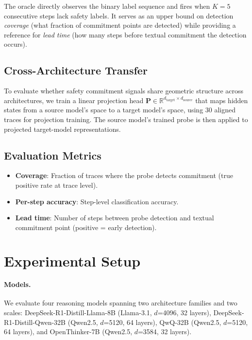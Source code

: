 \documentclass[11pt,a4paper]{article}
\begin{document}
The oracle directly observes the binary label sequence and fires when $K=5$ consecutive steps lack safety labels.
It serves as an upper bound on detection \emph{coverage} (what fraction of commitment points are detected) while providing a reference for \emph{lead time} (how many steps before textual commitment the detection occurs).

\subsection{Cross-Architecture Transfer}

To evaluate whether safety commitment signals share geometric structure across architectures, we train a linear projection head $\mathbf{P} \in \mathbb{R}^{d_{\text{target}} \times d_{\text{source}}}$ that maps hidden states from a source model's space to a target model's space, using 30 aligned traces for projection training.
The source model's trained probe is then applied to projected target-model representations.

\subsection{Evaluation Metrics}

\begin{itemize}
    \item \textbf{Coverage}: Fraction of traces where the probe detects commitment (true positive rate at trace level).
    \item \textbf{Per-step accuracy}: Step-level classification accuracy.
    \item \textbf{Lead time}: Number of steps between probe detection and textual commitment point (positive = early detection).
\end{itemize}

\section{Experimental Setup}

\paragraph{Models.} We evaluate four reasoning models spanning two architecture families and two scales: DeepSeek-R1-Distill-Llama-8B (Llama-3.1, $d$=4096, 32 layers), DeepSeek-R1-Distill-Qwen-32B (Qwen2.5, $d$=5120, 64 layers), QwQ-32B (Qwen2.5, $d$=5120, 64 layers), and OpenThinker-7B (Qwen2.5, $d$=3584, 32 layers).
\end{document}
